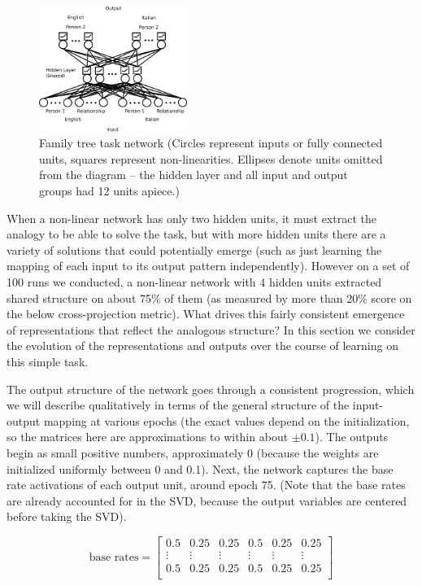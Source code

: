 \documentclass[10pt,letterpaper]{article}
\begin{document}
\begin{figure}
\centering
\includegraphics[width=0.43\textwidth]{figures/family_tree_network_diagram.png}
\caption{Family tree task network (Circles represent inputs or fully connected units, squares represent non-linearities. Ellipses denote units omitted from the diagram -- the hidden layer and all input and output groups had 12 units apiece.)}
\label{family_tree_network_diagram}
\end{figure}
When a non-linear network has only two hidden units, it must extract the analogy to be able to solve the task, but with more hidden units there are a variety of solutions that could potentially emerge (such as just learning the mapping of each input to its output pattern independently). However on a set of 100 runs we conducted, a non-linear network with 4 hidden units extracted shared structure on about 75\% of them (as measured by more than 20\% score on the below cross-projection metric). What drives this fairly consistent emergence of representations that reflect the analogous structure? In this section we consider the evolution of the representations and outputs over the course of learning on this simple task. \par 
The output structure of the network goes through a consistent progression, which we will describe qualitatively in terms of the general structure of the input-output mapping at various epochs (the exact values depend on the initialization, so the matrices here are approximations to within about \(\pm 0.1\)). The outputs begin as small positive numbers, approximately 0 (because the weights are initialized uniformly between 0 and 0.1). Next, the network captures the base rate activations of each output unit, around epoch 75. (Note that the base rates are already accounted for in the SVD, because the output variables are centered before taking the SVD). \par
{ 
\[ 
\text{base rates} = \left[ \begin{matrix} 
0.5 & 0.25 & 0.25 & 0.5 & 0.25 & 0.25 \\
\vdots & \vdots &\vdots &\vdots &\vdots &\vdots \\
 0.5 & 0.25 & 0.25 & 0.5 & 0.25 & 0.25\\
\end{matrix}  \right] 
\] 
}
\end{document}

